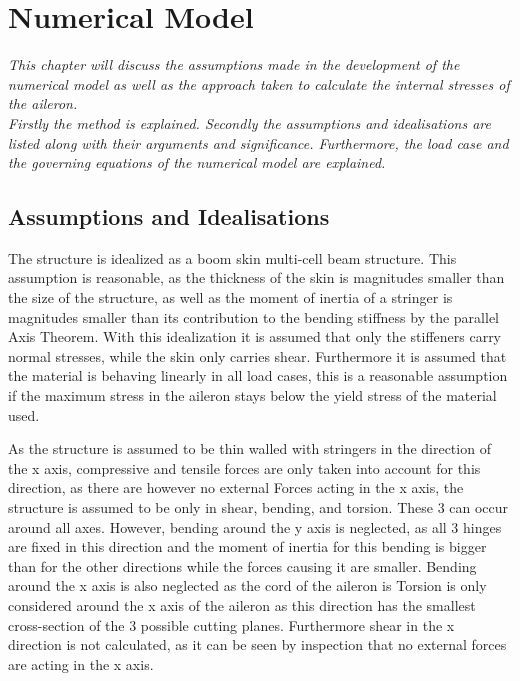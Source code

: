 \section{Numerical Model}
\label{sec:numerical_model}
\textit{This chapter will discuss the assumptions made in the development of the numerical model as well as the approach taken to calculate the internal stresses of the aileron.\\
Firstly the method is explained. Secondly the assumptions and idealisations are listed along with their arguments and significance. Furthermore, the load case and the governing equations of the numerical model are explained.}

\subsection{Assumptions and Idealisations}
\label{subsec:assumptions_numerical}
The structure is idealized as a boom skin multi-cell beam structure. This assumption is reasonable, as the thickness of the skin is magnitudes smaller than the size of the structure, as well as the moment of inertia of a stringer is magnitudes smaller than its contribution to the bending stiffness by the parallel Axis Theorem. With this idealization it is assumed that only the stiffeners carry normal stresses, while the skin only carries shear. Furthermore it is assumed that the material is behaving linearly in all load cases, this is a reasonable assumption if the maximum stress in the aileron stays below the yield stress of the material used.\par

As the structure is assumed to be thin walled with stringers in the direction of the x axis, compressive and tensile forces are only taken into account for this direction, as there are however no external Forces acting in the x axis, the structure is assumed to be only in shear, bending, and torsion. These 3 can occur around all axes. However, bending around the y axis is neglected, as all 3 hinges are fixed in this direction and the moment of inertia for this bending is bigger than for the other directions while the forces causing it are smaller. Bending around the x axis is also neglected as the cord of the aileron is  Torsion is only considered around the x axis of the aileron as this direction has the smallest cross-section of the 3 possible cutting planes. Furthermore shear in the x direction is not calculated, as it can be seen by inspection that no external forces are acting in the x axis.

